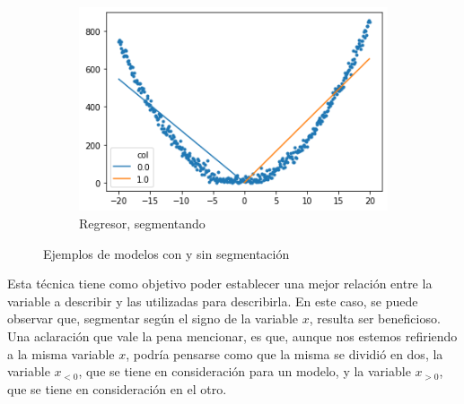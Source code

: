 \begin{figure}[H]
\begin{subfigure}{.3\textwidth}
            \centering
            \includegraphics[scale=.35]{img/explicaciones/3_seg.png}
            \caption{Regresor, segmentando}
        \end{subfigure}
        \caption{Ejemplos de modelos con y sin segmentación}
        \label{segs}
    \end{figure}
        
        
        
        
        
    
        Esta técnica tiene como objetivo poder establecer una mejor relación entre la variable a describir y las utilizadas para describirla. En este caso, se puede observar que, segmentar según el signo de la variable $x$, resulta ser beneficioso. Una aclaración que vale la pena mencionar, es que, aunque nos estemos refiriendo a la misma variable $x$, podría pensarse como que la misma se dividió en dos, la variable $x_{<0}$, que se tiene en consideración para un modelo, y la variable $x_{>0}$, que se tiene en consideración en el otro.

